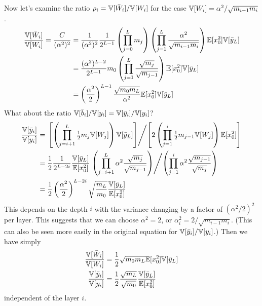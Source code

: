 Now let's examine the ratio $\rho_{i} = \mathbb{V}[\bar{W}_{i}] / \mathbb{V}[W_{i}]$ for the case $\mathbb{V}[W_{i}] = \alpha^{2} / \sqrt{m_{i-1} m_{i}}$.
\begin{align}
\frac{\mathbb{V}[\bar{W}_{i}]}{\mathbb{V}[W_{i}]} = \frac{C}{(\alpha^2)^2}
& = \frac{1}{(\alpha^2)^2} \frac{1}{2^{L-1}} \left(\prod_{j=0}^{L} m_{j} \right) \left(\prod_{j=1}^{L} \frac{\alpha^{2}}{\sqrt{m_{i-1} m_{i}}} \right) \mathbb{E}[x_{0}^2] \mathbb{V}[\bar{y}_{L}] \\
& = \frac{(\alpha^2)^{L-2}}{2^{L-1}} m_{0} \left(\prod_{j=1}^{L} \frac{\sqrt{m_{j}}}{\sqrt{m_{j-1}}} \right) \mathbb{E}[x_{0}^2] \mathbb{V}[\bar{y}_{L}] \\
& = \left(\frac{\alpha^2}{2}\right)^{L-1} \frac{\sqrt{m_{0} m_{L}}}{\alpha^2} \mathbb{E}[x_{0}^2] \mathbb{V}[\bar{y}_{L}]
\end{align}
What about the ratio $\mathbb{V}[\bar{b}_{i}] / \mathbb{V}[y_{i}] = \mathbb{V}[\bar{y}_{i}] / \mathbb{V}[y_{i}]$?
\begin{align}
\frac{\mathbb{V}[\bar{y}_{i}]}{\mathbb{V}[y_{i}]} & = \left.
  \left[ \left( \prod_{j = i+1}^{L} \tfrac{1}{2} m_{j} \mathbb{V}[W_{j}] \right) \mathbb{V}[\bar{y}_{L}] \right] \middle/
  \left[ 2 \left( \prod_{j = 1}^{i} \tfrac{1}{2} m_{j - 1} \mathbb{V}[W_{j}] \right) \mathbb{E}[x_{0}^2] \right] \right. \\
& = \frac{1}{2} \frac{1}{2^{L - 2 i}} \frac{\mathbb{V}[\bar{y}_{L}]}{\mathbb{E}[x_{0}^2]} \left.
  \left( \prod_{j = i+1}^{L} \alpha^2 \frac{\sqrt{m_{j}}}{\sqrt{m_{j-1}}} \right) \middle/
  \left( \prod_{j = 1}^{i} \alpha^2 \frac{\sqrt{m_{j-1}}}{\sqrt{m_{j}}} \right) \right. \\
& = \frac{1}{2} \left(\frac{\alpha^2}{2}\right)^{L - 2 i} \sqrt{\frac{m_{L}}{m_{0}}} \frac{\mathbb{V}[\bar{y}_{L}]}{\mathbb{E}[x_{0}^2]}
\end{align}
This depends on the depth $i$ with the variance changing by a factor of $(\alpha^2 / 2)^2$ per layer.
This suggests that we can choose $\alpha^2 = 2$, or $\alpha_{i}^2 = 2 / \sqrt{m_{i-1} m_{i}}$.
(This can also be seen more easily in the original equation for $\mathbb{V}[\bar{y}_{i}] / \mathbb{V}[y_{i}]$.)
Then we have simply
\begin{align}
\frac{\mathbb{V}[\bar{W}_{i}]}{\mathbb{V}[W_{i}]} & = \frac{1}{2} \sqrt{m_{0} m_{L}} \mathbb{E}[x_{0}^2] \mathbb{V}[\bar{y}_{L}] \\
\frac{\mathbb{V}[\bar{y}_{i}]}{\mathbb{V}[y_{i}]} & = \frac{1}{2} \frac{\sqrt{m_{L}}}{\sqrt{m_{0}}} \frac{\mathbb{V}[\bar{y}_{L}]}{\mathbb{E}[x_{0}^2]}
\end{align}
independent of the layer $i$.

